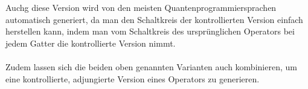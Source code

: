 Auchg diese Version wird von den meisten Quantenprogrammiersprachen automatisch generiert, da man den Schaltkreis der kontrollierten Version einfach herstellen kann, indem man vom Schaltkreis des ursprünglichen Operators bei jedem Gatter die kontrollierte Version nimmt.

\paragraph{}

Zudem lassen sich die beiden oben genannten Varianten auch kombinieren, um eine kontrollierte, adjungierte Version eines Operators zu generieren. 